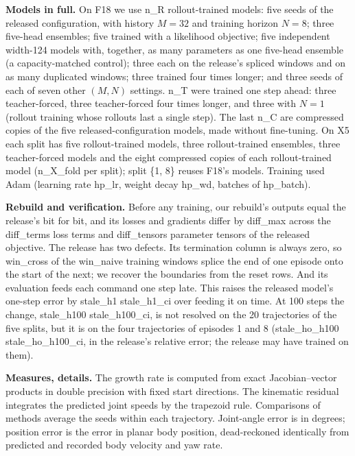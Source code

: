 \textbf{Models in full.} On F18 we use {{n_R}} rollout-trained models: five seeds of the released configuration, with
history $M=32$ and training horizon $N=8$; three five-head ensembles; five trained with a likelihood objective; five
independent width-124 models with, together, as many parameters as one five-head ensemble (a capacity-matched
control); three each on the release's spliced windows and on as many duplicated windows; three trained four times
longer; and three seeds of each of seven other $(M,N)$ settings. {{n_T}} were trained one step ahead: three
teacher-forced, three teacher-forced four times longer, and three with $N=1$ (rollout training whose rollouts last a
single step). The last {{n_C}} are compressed copies of the five released-configuration models, made without
fine-tuning. On X5 each split has five rollout-trained models, three rollout-trained ensembles, three teacher-forced
models and the eight compressed copies of each rollout-trained model ({{n_X_fold}} per split); split \{1, 8\} reuses
F18's models. Training used Adam (learning rate {{hp_lr}}, weight decay {{hp_wd}}, batches of {{hp_batch}}).

\textbf{Rebuild and verification.} Before any training, our rebuild's outputs equal the release's bit for bit, and
its losses and gradients differ by {{diff_max}} across the {{diff_terms}} loss terms and {{diff_tensors}} parameter
tensors of the released objective. The release has two defects. Its termination column is always zero, so
{{win_cross}} of the {{win_naive}} training windows splice the end of one episode onto the start of the next; we
recover the boundaries from the reset rows. And its evaluation feeds each command one step late. This raises the
released model's one-step error by {{stale_h1}} {{stale_h1_ci}} over feeding it on time. At 100 steps the change,
{{stale_h100}} {{stale_h100_ci}}, is not resolved on the 20 trajectories of the five splits, but it is on the four
trajectories of episodes 1 and 8 ({{stale_ho_h100}} {{stale_ho_h100_ci}}, in the release's relative error; the
release may have trained on them).

\textbf{Measures, details.} The growth rate is computed from exact Jacobian--vector products in double precision with
fixed start directions. The kinematic residual integrates the predicted joint speeds by the trapezoid rule.
Comparisons of methods average the seeds within each trajectory. Joint-angle error is in degrees; position error is
the error in planar body position, dead-reckoned identically from predicted and recorded body velocity and yaw rate.

